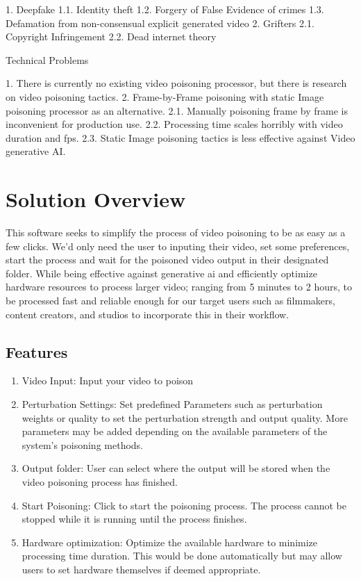 1. Deepfake
    1.1. Identity theft
    1.2. Forgery of False Evidence of crimes
    1.3. Defamation from non-consensual explicit generated video
2. Grifters
    2.1. Copyright Infringement
    2.2. Dead internet theory 

Technical Problems

1. There is currently no existing video poisoning processor, but there is research on video poisoning tactics.
2. Frame-by-Frame poisoning with static Image poisoning processor as an alternative.
    2.1. Manually poisoning frame by frame is inconvenient for production use.
    2.2. Processing time scales horribly with video duration and fps.
    2.3. Static Image poisoning tactics is less effective against Video generative AI.

\section{Solution Overview}
\label{section:solution-overview}

This software seeks to simplify the process of video poisoning to be as easy as a few clicks.
We'd only need the user to inputing their video, set some preferences, start the process and wait for the poisoned video output in their designated folder.
While being effective against generative ai and efficiently optimize hardware resources to process larger video; ranging from 5 minutes to 2 hours, to be processed fast and reliable enough for our target users such as filmmakers, content creators, and studios to incorporate this in their workflow. 

\subsection{Features}
\label{subsection:features}

\begin{enumerate}[leftmargin=80pt]
    \item Video Input: Input your video to poison
    \item Perturbation Settings: Set predefined Parameters such as perturbation weights or quality to set the perturbation strength and output quality. More parameters may be added depending on the available parameters of the system's poisoning methods.
    \item Output folder: User can select where the output will be stored when the video poisoning process has finished.
    \item Start Poisoning: Click to start the poisoning process. The process cannot be stopped while it is running until the process finishes.
    \item Hardware optimization: Optimize the available hardware to minimize processing time duration. This would be done automatically but may allow users to set hardware themselves if deemed appropriate.
\end{enumerate}

